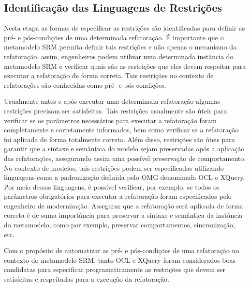\subsection{Identificação das Linguagens de Restrições}
Nesta etapa as formas de especificar as restrições são identificadas para definir as pré- e pós-condições de uma determinada refatoração. É importante que o metamodelo SRM permita definir tais restrições e não apenas o mecanismo da refatoração, assim, engenheiros podem utilizar uma determinada instância do metamodelo SRM e verificar quais são as restrições que eles devem respeitar para executar a refatoração de forma correta. Tais restrições no contexto de refatorações são conhecidas como pré- e pós-condições\cite{OPDYKE_1992, Roberts_1999}.

Usualmente antes e após executar uma determinada refatoração algumas restrições precisam ser satisfeitas. Tais restrições usualmente são úteis para verificar se os parâmetros necessários para executar a refatoração foram completamente e corretamente informados, bem como verificar se a refatoração foi aplicada de forma totalmente correta. Além disso, restrições são úteis para garantir que a sintaxe e semântica do modelo sejam preservadas após a aplicação das refatorações, assegurando assim uma possível preservação de comportamento. No contexto de modelos, tais restrições podem ser especificadas utilizando linguagens como a padronização definida pelo OMG denominada OCL e XQuery. Por meio dessas linguagens, é possível verificar, por exemplo, se todos os parâmetros obrigatórios para executar a refatoração foram especificados pelo engenheiro de modernização. Assegurar que a refatoração será aplicada de forma correta é de suma importância para preservar a sintaxe e semântica da instância do metamodelo, como por exemplo, preservar comportamentos, sincronização, etc. 

Com o propósito de automatizar as pré- e pós-condições de uma refatoração no contexto do metamodelo SRM, tanto OCL e XQuery foram considerados boas candidatas para especificar programaticamente as restrições que devem ser satisfeitas e respeitadas para a execução da refatoração.




